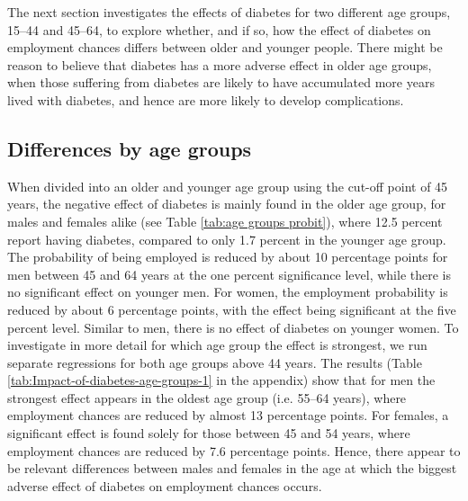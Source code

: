 The next section investigates the effects of diabetes for
two different age groups, 15--44 and 45--64, to explore whether, and
if so, how the effect of diabetes on employment chances differs between
older and younger people. There might be reason to believe that diabetes
has a more adverse effect in older age groups, when those suffering
from diabetes are likely to have accumulated more years lived with
diabetes, and hence are more likely to develop complications. 

\FloatBarrier
\subsection{Differences by age groups }

When divided into an older and younger age group using the
cut-off point of 45 years, the negative effect of diabetes is mainly
found in the older age group, for males and females alike (see Table
\ref{tab:age groups probit}), where 12.5 percent report having diabetes,
compared to only 1.7 percent in the younger age group. The probability
of being employed is reduced by about 10 percentage points for men
between 45 and 64 years at the one percent significance level, while
there is no significant effect on younger men. For women, the employment
probability is reduced by about 6 percentage points, with the effect
being significant at the five percent level. Similar to men, there
is no effect of diabetes on younger women. To investigate in more
detail for which age group the effect is strongest, we run separate
regressions for both age groups above 44 years. The results (Table
\ref{tab:Impact-of-diabetes-age-groups-1} in the appendix) show that
for men the strongest effect appears in the oldest age group (i.e.
55--64 years), where employment chances are reduced by almost 13 percentage
points. For females, a significant effect is found solely for those
between 45 and 54 years, where employment chances are reduced by 7.6
percentage points. Hence, there appear to be relevant differences
between males and females in the age at which the biggest adverse
effect of diabetes on employment chances occurs. 


